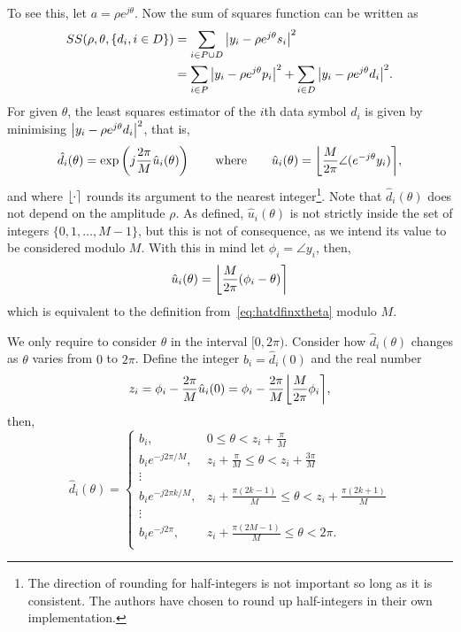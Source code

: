 \documentclass[a4paper,10pt]{article}
\begin{document}
To see this, let $a = \rho e^{j\theta}$.  Now the sum of squares function can be written as
\begin{align*}
SS(\rho, \theta, \{d_i, i \in D\}) &= \sum_{i \in P \cup D} {\left|  y_i - \rho e^{j\theta} s_i  \right|}^2  \\
&= \sum_{i \in P} {\left|  y_i - \rho e^{j\theta} p_i  \right|}^2 + \sum_{i \in D} {\left|  y_i - \rho e^{j\theta} d_i  \right|}^2.
\end{align*}
For given $\theta$, the least squares estimator of the $i$th data symbol $d_i$ is given by minimising ${\left|  y_i - \rho e^{j\theta} d_i  \right|}^2$, that is,
\begin{equation}\label{eq:hatdfinxtheta}
\hat{d}_i(\theta) = \exp\left( j\frac{2\pi}{M}\hat{u}_i(\theta) \right) \qquad \text{where} \qquad \hat{u}_i(\theta) = {\left\lfloor \frac{M}{2\pi}\angle( e^{-j\theta}y_i) \right\rceil},
\end{equation}
and where ${\left\lfloor \cdot \right\rceil}$ rounds its argument to the nearest integer\footnote{The direction of rounding for half-integers is not important so long as it is consistent.  The authors have chosen to round up half-integers in their own implementation.}.  Note that $\hat{d}_i(\theta)$ does not depend on the amplitude $\rho$.  As defined, $\hat{u}_i(\theta)$ is not strictly inside the set of integers $\{0, 1, \dots, M-1\}$, but this is not of consequence, as we intend its value to be considered modulo $M$.  With this in mind let $\phi_i = \angle y_i$, then,
\[
\hat{u}_i(\theta) = {\left\lfloor \frac{M}{2\pi}( \phi_i - \theta ) \right\rceil}
\]
which is equivalent to the definition from~\eqref{eq:hatdfinxtheta} modulo $M$.

We only require to consider $\theta$ in the interval $[0, 2\pi)$.  Consider how $\hat{d}_i(\theta)$ changes as $\theta$ varies from $0$ to $2\pi$.  Define the integer $b_i = \hat{d}_i(0)$ and the real number 
\[
z_i = \phi_i - \frac{2\pi}{M}\hat{u}_i(0) = \phi_i - \frac{2\pi}{M}{\left\lfloor \frac{M}{2\pi}\phi_i \right\rceil},
\]
then,
\begin{equation}\label{eq:uicombos}
\hat{d}_i(\theta) = 
\begin{cases}
b_i, &  0 \leq \theta < z_i + \frac{\pi}{M} \\
b_i e^{-j2\pi/M}, & z_i + \frac{\pi}{M} \leq \theta < z_i + \frac{3\pi}{M} \\ 
\vdots & \\
b_i e^{-j2\pi k /M}, & z_i + \frac{\pi(2k - 1)}{M} \leq \theta < z_i + \frac{\pi(2k + 1)}{M}  \\ 
\vdots & \\
b_i e^{-j2\pi}, &  z_i + \frac{\pi(2M - 1)}{M} \leq \theta < 2\pi. \\
\end{cases}
\end{equation}
\end{document}
